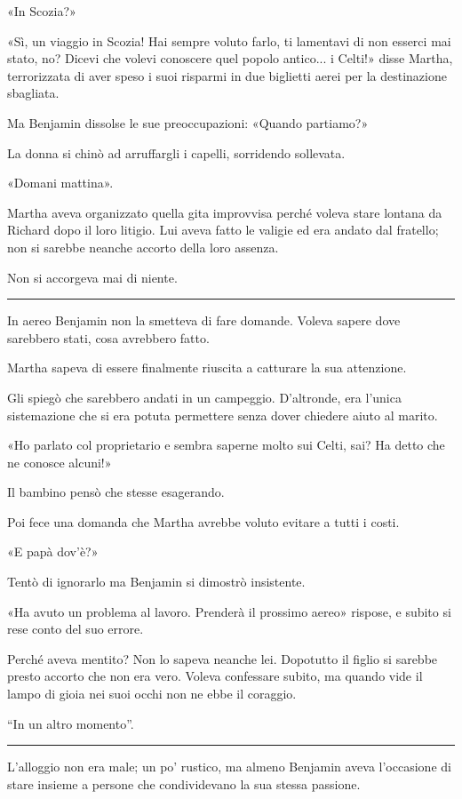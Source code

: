 \documentclass[a4paper,11pt,oneside,openright,final]{memoir}
\begin{document}
«In Scozia?»

«Sì, un viaggio in Scozia! Hai sempre voluto farlo, ti lamentavi di non
esserci mai stato, no? Dicevi che volevi conoscere quel popolo antico... i
Celti!» disse Martha, terrorizzata di aver speso i suoi risparmi in due
biglietti aerei per la destinazione sbagliata.

Ma Benjamin dissolse le sue preoccupazioni: «Quando partiamo?»

La donna si chinò ad arruffargli i capelli, sorridendo sollevata.

«Domani mattina».

Martha aveva organizzato quella gita improvvisa perché voleva stare lontana da
Richard dopo il loro litigio. Lui aveva fatto le valigie ed era andato dal
fratello; non si sarebbe neanche accorto della loro assenza.

Non si accorgeva mai di niente.

\plainbreak{1}

In aereo Benjamin non la smetteva di fare domande. Voleva sapere dove sarebbero
stati, cosa avrebbero fatto.

Martha sapeva di essere finalmente riuscita a catturare la sua attenzione.

Gli spiegò che sarebbero andati in un campeggio. D'altronde, era l'unica
sistemazione che si era potuta permettere senza dover chiedere aiuto al marito.

«Ho parlato col proprietario e sembra saperne molto sui Celti, sai? Ha detto
che ne conosce alcuni!»

Il bambino pensò che stesse esagerando.

Poi fece una domanda che Martha avrebbe voluto evitare a tutti i costi.

«E papà dov'è?»

Tentò di ignorarlo ma Benjamin si dimostrò insistente.

«Ha avuto un problema al lavoro. Prenderà il prossimo aereo» rispose, e
subito si rese conto del suo errore.

Perché aveva mentito? Non lo sapeva neanche lei. Dopotutto il figlio si sarebbe
presto accorto che non era vero. Voleva confessare subito, ma quando vide il
lampo di gioia nei suoi occhi non ne ebbe il coraggio.

``In un altro momento''.
\plainbreak{1}

L’alloggio non era male; un po' rustico, ma almeno Benjamin aveva l'occasione
di stare insieme a persone che condividevano la sua stessa passione.
\end{document}
